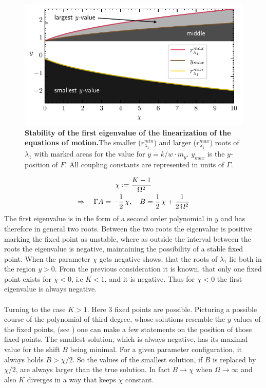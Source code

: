 \begin{figure}
    \centering
    \includegraphics{pictures/sign_of_ev1_streched.pdf}
    \caption{\textbf{Stability of the first eigenvalue of the linearization of the equations of motion.}The smaller ($r_{\lambda_1}^{min}$) and larger ($r_{\lambda_1}^{max}$) roots of $\lambda_1$ with marked areas for the value for ${y}=k/w\cdot m_y$. ${y}_{max}$ is the ${y}$-position of $F$. All coupling constants are represented in units of $\Gamma$.}
    \label{fig:sign_lam1}
\end{figure}
\begin{gather*}
    \chi\vcentcolon=\frac{K-1}{\Omega^2}\\
    \Rightarrow\quad\Gamma A=-\half\,\chi,\quad
    B=\half\,\chi+\frac{1}{2\,\Omega^2}%
\end{gather*}
The first eigenvalue is in the form of a second order polynomial in $y$ and has therefore in general two roots. Between the two roots the eigenvalue is positive marking the fixed point as unstable, where as outside the interval between the roots the eigenvalue is negative, maintaining the possibility of a stable fixed point. When the parameter $\chi$ gets negative  shows, that the roots of $\lambda_1$ lie both in the region $y>0$. From the previous consideration it is known, that only one fixed point exists for $\chi<0$, i.e $K<1$, and it is negative. Thus for $\chi<0$ the first eigenvalue is always negative.\\\\
Turning to the case $K>1$. Here 3 fixed points are possible. Picturing a possible course of the polynomial of third degree, whose solutions resemble the $y$-values of the fixed points, (see ) one can make a few statements on the position of those fixed points. The smallest solution, which is always negative, has its maximal value for the shift $B$ being minimal. For a given parameter configuration, it always holds $B>\chi/2$. So the values of the smallest solution, if $B$ is replaced by $\chi/2$, are always larger than the true solution. In fact $B\rightarrow\chi$ when $\Omega\rightarrow\infty$ and also $K$ diverges in a way that keeps $\chi$ constant.
